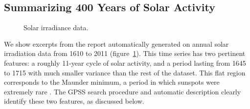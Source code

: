 \documentclass{article}
\begin{document}


\subsection{Summarizing 400 Years of Solar Activity}
\label{sec:solar}

\begin{figure}[h]
\centering
{}
\caption{
Solar irradiance data.}
\label{fig:solar}
\end{figure}

We show excerpts from the report automatically generated on annual solar irradiation data from 1610 to 2011 (figure~\ref{fig:solar}).
This time series has two pertinent features: a roughly 11-year cycle of solar activity, and a period lasting from 1645 to 1715 with much smaller variance than the rest of the dataset.  This flat region corresponds to the Maunder minimum, a period in which sunspots were extremely rare \citep{lean1995reconstruction}.
The GPSS search procedure and automatic description clearly identify these two features, as discussed below.
\end{document}
